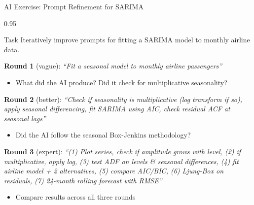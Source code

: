 \documentclass[9pt, aspectratio=169, t]{beamer}
\begin{document}
\begin{frame}{AI Exercise: Prompt Refinement for SARIMA}
    \begin{cminipage}{0.95\textwidth}
    \begin{block}{Task}
        Iteratively improve prompts for fitting a SARIMA model to monthly airline data.
    \end{block}

    \vspace{0.2cm}

    \textbf{Round 1} (vague): \textit{``Fit a seasonal model to monthly airline passengers''}
    \begin{itemize}\setlength{\itemsep}{0pt}
        \item What did the AI produce? Did it check for multiplicative seasonality?
    \end{itemize}

    \textbf{Round 2} (better): \textit{``Check if seasonality is multiplicative (log transform if so), apply seasonal differencing, fit SARIMA using AIC, check residual ACF at seasonal lags''}
    \begin{itemize}\setlength{\itemsep}{0pt}
        \item Did the AI follow the seasonal Box-Jenkins methodology?
    \end{itemize}

    \textbf{Round 3} (expert): \textit{``(1) Plot series, check if amplitude grows with level, (2) if multiplicative, apply log, (3) test ADF on levels \& seasonal differences, (4) fit airline model + 2 alternatives, (5) compare AIC/BIC, (6) Ljung-Box on residuals, (7) 24-month rolling forecast with RMSE''}
    \begin{itemize}\setlength{\itemsep}{0pt}
        \item Compare results across all three rounds
    \end{itemize}
    \end{cminipage}
\end{frame}
\end{document}
